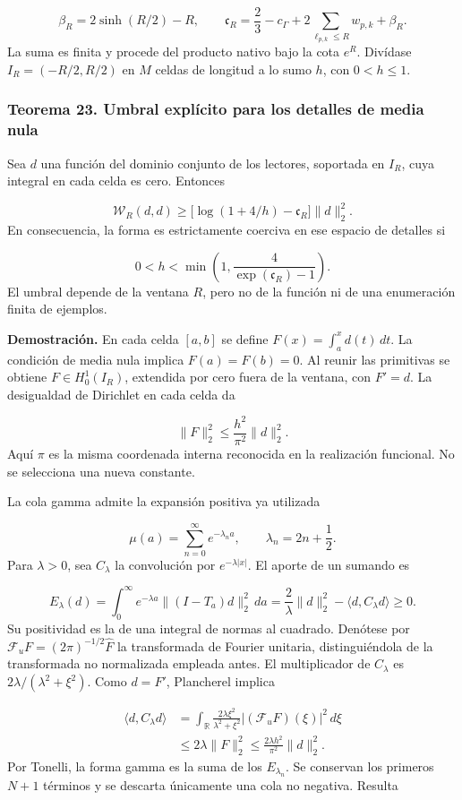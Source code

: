 \[
\beta_R=2\sinh(R/2)-R,\qquad
\mathfrak c_R=\frac23-c_\Gamma+
2\sum_{\ell_{p,k}\leq R}w_{p,k}+\beta_R.
\]
La suma es finita y procede del producto nativo bajo la cota \(e^R\). Divídase \(I_R=(-R/2,R/2)\) en \(M\) celdas de longitud a lo sumo \(h\), con \(0<h\leq1\).

\subsubsection*{Teorema 23. Umbral explícito para los detalles de media nula}
Sea \(d\) una función del dominio conjunto de los lectores, soportada en \(I_R\), cuya integral en cada celda es cero. Entonces

\[
\boxed{\mathscr W_R(d,d)\geq
\bigl[\log(1+4/h)-\mathfrak c_R\bigr]\|d\|_2^2.}
\]
En consecuencia, la forma es estrictamente coerciva en ese espacio de detalles si

\[
0<h<\min\left(1,\frac4{\exp(\mathfrak c_R)-1}\right).
\]
El umbral depende de la ventana \(R\), pero no de la función ni de una enumeración finita de ejemplos.

\textbf{Demostración.} En cada celda \([a,b]\) se define \(F(x)=\int_a^x d(t)\,dt\). La condición de media nula implica \(F(a)=F(b)=0\). Al reunir las primitivas se obtiene \(F\in H_0^1(I_R)\), extendida por cero fuera de la ventana, con \(F'=d\). La desigualdad de Dirichlet en cada celda da

\[
\|F\|_2^2\leq\frac{h^2}{\pi^2}\|d\|_2^2.
\]
Aquí \(\pi\) es la misma coordenada interna reconocida en la realización funcional. No se selecciona una nueva constante.

La cola gamma admite la expansión positiva ya utilizada

\[
\mu(a)=\sum_{n=0}^{\infty}e^{-\lambda_n a},
\qquad \lambda_n=2n+\frac12.
\]
Para \(\lambda>0\), sea \(C_\lambda\) la convolución por \(e^{-\lambda|x|}\). El aporte de un sumando es

\[
E_\lambda(d)=\int_0^\infty e^{-\lambda a}
\|(I-T_a)d\|_2^2\,da
=\frac2\lambda\|d\|_2^2-
\langle d,C_\lambda d\rangle\geq0.
\]
Su positividad es la de una integral de normas al cuadrado. Denótese por \(\mathcal F_u F=(2\pi)^{-1/2}\widehat F\) la transformada de Fourier unitaria, distinguiéndola de la transformada no normalizada empleada antes. El multiplicador de \(C_\lambda\) es \(2\lambda/(\lambda^2+\xi^2)\). Como \(d=F'\), Plancherel implica

\[
\begin{aligned}
\langle d,C_\lambda d\rangle
&=\int_{\mathbb R}
\frac{2\lambda\xi^2}{\lambda^2+\xi^2}
|(\mathcal F_u F)(\xi)|^2\,d\xi\\
&\leq2\lambda\|F\|_2^2
\leq\frac{2\lambda h^2}{\pi^2}\|d\|_2^2.
\end{aligned}
\]
Por Tonelli, la forma gamma es la suma de los \(E_{\lambda_n}\). Se conservan los primeros \(N+1\) términos y se descarta únicamente una cola no negativa. Resulta


